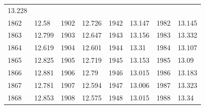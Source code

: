 \begin{description}[noitemsep]
\begin{description}[noitemsep]
\begin{table}
\begin{center}
\begin{xtabular}[t]{|l|l|l|l|l|l|l|l|}
        	13.228	%
     \tabularnewline{}
        	1862	 &
        	12.58	 &
        	1902	 &
        	12.726	 &
        	1942	 &
        	13.147	 &
        	1982	 &
        	13.145	%
     \tabularnewline{}
        	1863	 &
        	12.799	 &
        	1903	 &
        	12.647	 &
        	1943	 &
        	13.156	 &
        	1983	 &
        	13.332	%
     \tabularnewline{}
        	1864	 &
        	12.619	 &
        	1904	 &
        	12.601	 &
        	1944	 &
        	13.31	 &
        	1984	 &
        	13.107	%
     \tabularnewline{}
        	1865	 &
        	12.825	 &
        	1905	 &
        	12.719	 &
        	1945	 &
        	13.153	 &
        	1985	 &
        	13.09	%
     \tabularnewline{}
        	1866	 &
        	12.881	 &
        	1906	 &
        	12.79	 &
        	1946	 &
        	13.015	 &
        	1986	 &
        	13.183	%
     \tabularnewline{}
        	1867	 &
        	12.781	 &
        	1907	 &
        	12.594	 &
        	1947	 &
        	13.006	 &
        	1987	 &
        	13.323	%
     \tabularnewline{}
        	1868	 &
        	12.853	 &
        	1908	 &
        	12.575	 &
        	1948	 &
        	13.015	 &
        	1988	 &
        	13.34	%
     \tabularnewline{}

\end{xtabular}
\end{center}
\end{table}
\end{description}
\end{description}
